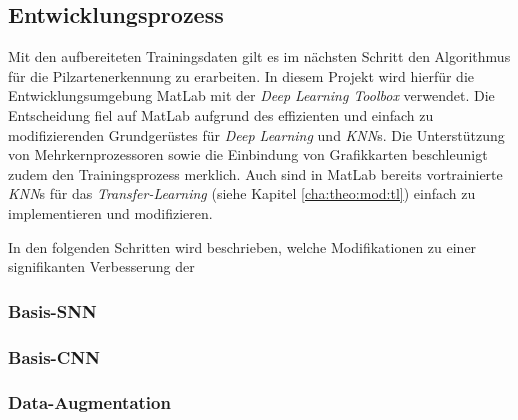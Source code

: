 
\subsection{Entwicklungsprozess}\label{cha:met:dev}
Mit den aufbereiteten Trainingsdaten gilt es im nächsten Schritt den Algorithmus für die Pilzartenerkennung zu erarbeiten. In diesem Projekt wird hierfür die Entwicklungsumgebung MatLab mit der \textit{Deep Learning Toolbox}\cite{matlab} verwendet. Die Entscheidung fiel auf MatLab aufgrund des effizienten und einfach zu modifizierenden Grundgerüstes für \textit{Deep Learning} und \textit{KNN}s. Die Unterstützung von Mehrkernprozessoren sowie die Einbindung von Grafikkarten beschleunigt zudem den Trainingsprozess merklich. Auch sind in MatLab bereits vortrainierte \textit{KNN}s für das \textit{Transfer-Learning} (siehe Kapitel \ref{cha:theo:mod:tl}) einfach zu implementieren und modifizieren.

In den folgenden Schritten wird beschrieben, welche Modifikationen zu einer signifikanten Verbesserung der 

\subsubsection{Basis-SNN}


\subsubsection{Basis-CNN}

\subsubsection{Data-Augmentation}

